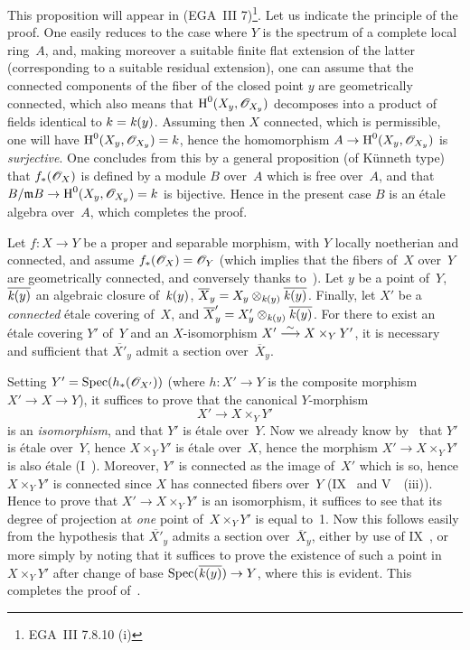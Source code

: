 This proposition will appear in (EGA~III 7)\footnote{\Cf EGA~III
7.8.10 (i)}. Let us indicate the principle of the proof. One easily
reduces to the case where $Y$ is the spectrum of a complete local
ring~$A$, and, making moreover a suitable finite flat
extension of the latter (corresponding to a suitable
residual extension), one can assume that the connected
components of the fiber of the closed point $y$ are
geometrically connected, which also means that
$\H^0(X_y,\cal{O}_{X_y})$ decomposes into a product of fields
identical to $k=\mathit{k}(y)$. Assuming then $X$ connected, which is
permissible, one will have $\H^0(X_y,\cal{O}_{X_y})=k$, hence the homomorphism
$A\to \H^0(X_y,\cal{O}_{X_y})$ is \emph{surjective}. One concludes from this by
a general proposition (of K\"unneth type) that
$f_*(\cal{O}_X)$ is defined by a module $B$ over~$A$ which is
free over~$A$, and that $B/\goth{m} B\to \H^0(X_y,\cal{O}_{X_y})=k$ is
bijective. Hence in the present case $B$ is an \'etale algebra
over~$A$, which completes the proof.

\begin{theorem}
\label{X.1.3}
Let $f\colon X\to Y$ be a proper and separable morphism, with $Y$
locally noetherian and connected, and assume
$f_*(\cal{O}_X)=\cal{O}_Y$ (which implies that the fibers of~$X$ over~$Y$ are geometrically connected, and conversely
thanks to~). Let $y$ be a point of~$Y$,
$\overline{\mathit{k}(y)}$ an algebraic closure of~$\mathit{k}(y)$,
$\overline X_y =X_y\otimes_{\mathit{k}(y)} \overline{\mathit{k}(y)}$. Finally, let $X'$ be a \emph{connected} \'etale covering of~$X$, and $\overline
X_y' =X_y'\otimes_{\mathit{k}(y)} \overline{\mathit{k}(y)}$. For there to exist an
\'etale covering $Y'$ of~$Y$ and an $X$-isomorphism
$X'\overset{\sim}{\longrightarrow} X\times_Y Y'$, it is necessary and sufficient that $\overline{X'}_y$
admit a section over~$\overline X_y$.
\end{theorem}

Setting $Y'=\Spec(h_*(\cal{O}_{X'}))$ (where $h\colon X'\to Y$ is the
composite morphism $X'\to X\to Y$), it suffices to prove that the
canonical $Y$-morphism
$$
X'\to X\times_Y Y'
$$
is an \emph{isomorphism}, and that $Y'$ is \'etale over~$Y$. Now we
already know by~ that $Y'$ is \'etale over~$Y$,
hence $X\times_Y Y'$ is \'etale over~$X$, hence the morphism $X'\to
X\times_Y Y'$ is also \'etale (I~). Moreover,
$Y'$ is connected as the image of~$X'$ which is so, hence $X\times_Y Y'$
is connected since $X$ has connected fibers over~$Y$
(IX~ and V~~(iii)). Hence to prove that
$X'\to X\times_Y Y'$ is an isomorphism, it suffices to see that its
degree of projection at \emph{one} point of~$X\times_Y Y'$ is
equal to~1. Now this follows easily from the hypothesis
that $\overline{X'}_y$ admits a section over~$\overline X_y$, either
by use of IX~, or more simply by noting that it
suffices to prove the existence of such a point in $X\times_Y Y'$
after change of base
$\Spec(\overline{\kres(y)})\to Y$, where this
is evident. This completes the proof of~.

